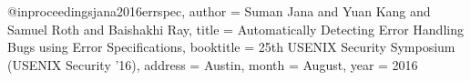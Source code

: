 @inproceedings{jana2016errspec,
	author = {Suman Jana and Yuan Kang and Samuel Roth and Baishakhi Ray},
	title = {{Automatically Detecting Error Handling Bugs using Error Specifications}},
	booktitle = {25th USENIX Security Symposium (USENIX Security '16)},
	address = {Austin},
	month = {August},
	year = 2016
}

